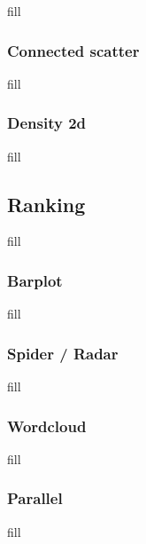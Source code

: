 \documentclass[
  b5paper]{book}
\begin{document}
fill

\hypertarget{connected-scatter}{%
\subsubsection*{Connected scatter}\label{connected-scatter}}

fill

\hypertarget{density-2d}{%
\subsubsection*{Density 2d}\label{density-2d}}

fill

\hypertarget{ranking}{%
\subsection*{Ranking}\label{ranking}}

fill

\hypertarget{barplot}{%
\subsubsection*{Barplot}\label{barplot}}

fill

\hypertarget{spider-radar}{%
\subsubsection*{Spider / Radar}\label{spider-radar}}

fill

\hypertarget{wordcloud}{%
\subsubsection*{Wordcloud}\label{wordcloud}}

fill

\hypertarget{parallel}{%
\subsubsection*{Parallel}\label{parallel}}

fill
\end{document}
